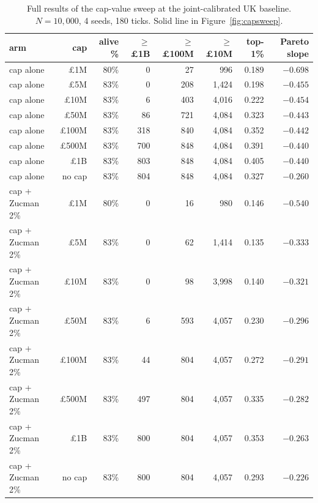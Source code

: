 \documentclass[11pt]{article}
\begin{document}
\begin{table}[h]
\centering
\small
\caption{Full results of the cap-value sweep at the joint-calibrated
UK baseline.  $N = 10{,}000$, 4 seeds, 180 ticks.  Solid line in
Figure~\ref{fig:capsweep}.}
\begin{tabular}{lrrrrrrr}
\toprule
arm & cap & alive \% & $\geq$\pounds 1B & $\geq$\pounds 100M
& $\geq$\pounds 10M & top-1\% & Pareto slope \\
\midrule
cap alone & \pounds 1M   & 80\% &   0 &  27 &   996 & 0.189 & $-0.698$ \\
cap alone & \pounds 5M   & 83\% &   0 & 208 & 1{,}424 & 0.198 & $-0.455$ \\
cap alone & \pounds 10M  & 83\% &   6 & 403 & 4{,}016 & 0.222 & $-0.454$ \\
cap alone & \pounds 50M  & 83\% &  86 & 721 & 4{,}084 & 0.323 & $-0.443$ \\
cap alone & \pounds 100M & 83\% & 318 & 840 & 4{,}084 & 0.352 & $-0.442$ \\
cap alone & \pounds 500M & 83\% & 700 & 848 & 4{,}084 & 0.391 & $-0.440$ \\
cap alone & \pounds 1B   & 83\% & 803 & 848 & 4{,}084 & 0.405 & $-0.440$ \\
cap alone & no cap        & 83\% & 804 & 848 & 4{,}084 & 0.327 & $-0.260$ \\
\midrule
cap + Zucman 2\% & \pounds 1M   & 80\% &   0 &  16 &   980 & 0.146 & $-0.540$ \\
cap + Zucman 2\% & \pounds 5M   & 83\% &   0 &  62 & 1{,}414 & 0.135 & $-0.333$ \\
cap + Zucman 2\% & \pounds 10M  & 83\% &   0 &  98 & 3{,}998 & 0.140 & $-0.321$ \\
cap + Zucman 2\% & \pounds 50M  & 83\% &   6 & 593 & 4{,}057 & 0.230 & $-0.296$ \\
cap + Zucman 2\% & \pounds 100M & 83\% &  44 & 804 & 4{,}057 & 0.272 & $-0.291$ \\
cap + Zucman 2\% & \pounds 500M & 83\% & 497 & 804 & 4{,}057 & 0.335 & $-0.282$ \\
cap + Zucman 2\% & \pounds 1B   & 83\% & 800 & 804 & 4{,}057 & 0.353 & $-0.263$ \\
cap + Zucman 2\% & no cap        & 83\% & 800 & 804 & 4{,}057 & 0.293 & $-0.226$ \\
\bottomrule
\end{tabular}
\end{table}
\end{document}
